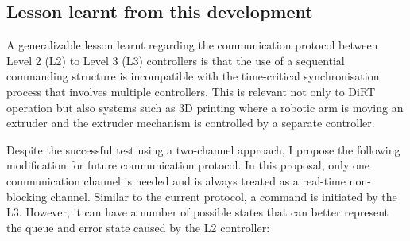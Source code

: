 \documentclass[11pt]{book}
\begin{document}
\subsection{Lesson learnt from this development}

A generalizable lesson learnt regarding the communication protocol between Level 2 (L2) to Level 3 (L3) controllers is that the use of a sequential commanding structure is incompatible with the time-critical synchronisation process that involves multiple controllers. This is relevant not only to DiRT operation but also systems such as 3D printing where a robotic arm is moving an extruder and the extruder mechanism is controlled by a separate controller.

Despite the successful test using a two-channel approach, I propose the following modification for future communication protocol. In this proposal, only one communication channel is needed and is always treated as a real-time non-blocking channel. Similar to the current protocol, a command is initiated by the L3. However, it can have a number of possible states that can better represent the queue and error state caused by the L2 controller:
\end{document}
